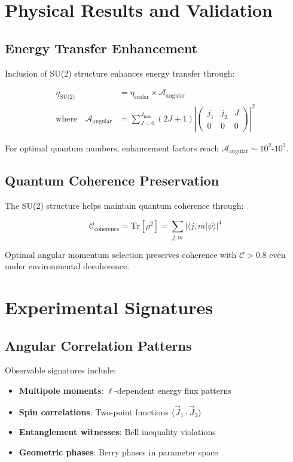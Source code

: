 \documentclass[12pt]{article}
\begin{document}
\section{Physical Results and Validation}

\subsection{Energy Transfer Enhancement}

Inclusion of SU(2) structure enhances energy transfer through:

\begin{align}
\eta_{\text{SU(2)}} &= \eta_{\text{scalar}} \times \mathcal{A}_{\text{angular}} \\
\text{where} \quad \mathcal{A}_{\text{angular}} &= \sum_{J=0}^{J_{\max}} (2J+1) \left| \begin{pmatrix} j_1 & j_2 & J \\ 0 & 0 & 0 \end{pmatrix} \right|^2
\end{align}

For optimal quantum numbers, enhancement factors reach $\mathcal{A}_{\text{angular}} \sim 10^2$-$10^3$.

\subsection{Quantum Coherence Preservation}

The SU(2) structure helps maintain quantum coherence through:

\begin{equation}
\mathcal{C}_{\text{coherence}} = \text{Tr}[\rho^2] = \sum_{j,m} \left| \langle j,m | \psi \rangle \right|^4
\end{equation}

Optimal angular momentum selection preserves coherence with $\mathcal{C} > 0.8$ even under environmental decoherence.

\section{Experimental Signatures}

\subsection{Angular Correlation Patterns}

Observable signatures include:

\begin{itemize}
\item \textbf{Multipole moments}: $\ell$-dependent energy flux patterns
\item \textbf{Spin correlations}: Two-point functions $\langle \vec{J}_1 \cdot \vec{J}_2 \rangle$
\item \textbf{Entanglement witnesses}: Bell inequality violations
\item \textbf{Geometric phases}: Berry phases in parameter space
\end{itemize}
\end{document}
